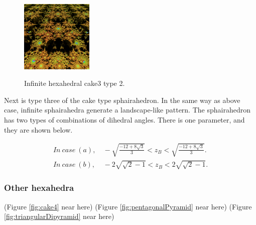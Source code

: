 \documentclass[suppldata, dvipdfmx]{interact}
\theoremstyle{plain}%
\theoremstyle{definition}
\theoremstyle{remark}
\theoremstyle{problemstyle}
\begin{document}
\begin{figure}[H]
\begin{minipage}{0.5\textwidth}
\begin{minipage}[t]{0.24\textwidth}
  \end{minipage}
  \hspace*{\fill}
  \begin{minipage}[t]{0.24\textwidth}
   \centering
   \includegraphics[width=1.35in, height=1.35in,
   keepaspectratio]{./img/sphairahedron/hexahedralCake3/limitsetInf_b.jpg} 
   \label{fig:cake3infiniteLimitsetType2}
  \end{minipage}
  \hspace*{\fill}
  \caption{Infinite hexahedral cake3 type 2.}
  \label{fig:cake3infiniteType2}
 \end{minipage}
\end{figure}

Next is type three of the cake type sphairahedron.
In the same way as above case, infinite sphairahedra generate a landscape-like pattern.
The sphairahedron has two types of combinations of dihedral angles.
There is one parameter, and they are shown below.

\begin{align*}
   In~case~(a),&~-\sqrt{\frac{-12 + 8 \sqrt{3}}{3}} < z_B < \sqrt{\frac{-12 + 8 \sqrt{3}}{3}}.\\
   In~case~(b),&~-2\sqrt{\sqrt{2} - 1} < z_B < 2\sqrt{\sqrt{2} -1}.
\end{align*}


\subsubsection{Other hexahedra}

\noindent(Figure \ref{fig:cake4} near here)
(Figure \ref{fig:pentagonalPyramid} near here)
(Figure \ref{fig:triangularDipyramid} near here)
\end{document}
